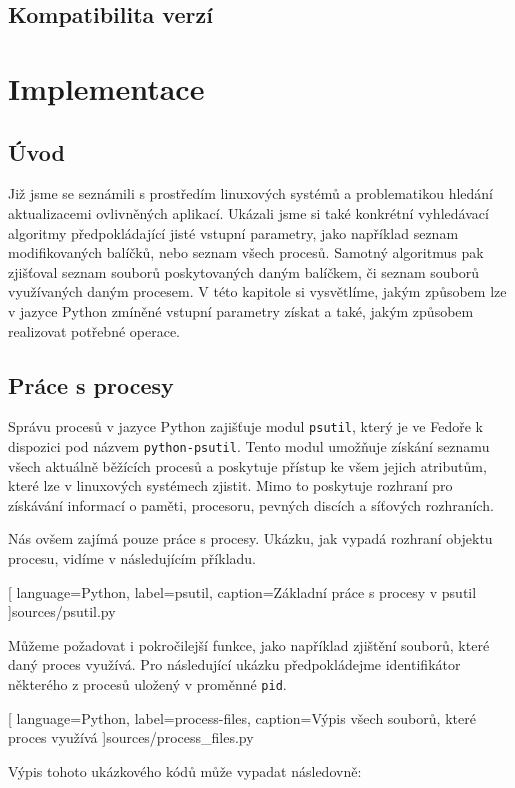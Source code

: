 \documentclass[
  field=inf,
  biblatex,
  glossaries,
  index
]{kidiplom}
\begin{document}
	\subsection{Kompatibilita verzí}

\newpage
\section{Implementace}
	\subsection{Úvod}
	Již jsme se seznámili s prostředím linuxových systémů a problematikou hledání aktualizacemi ovlivněných aplikací. Ukázali jsme si také konkrétní vyhledávací algoritmy předpokládající jisté vstupní parametry, jako například seznam modifikovaných balíčků, nebo seznam všech procesů. Samotný algoritmus pak zjišťoval seznam souborů poskytovaných daným balíčkem, či seznam souborů využívaných daným procesem. V této kapitole si vysvětlíme, jakým způsobem lze v jazyce Python zmíněné vstupní parametry získat a také, jakým způsobem realizovat potřebné operace.

	\subsection{Práce s procesy}
	Správu procesů v jazyce Python zajišťuje modul \texttt{psutil}, který je ve Fedoře k dispozici pod názvem \texttt{python-psutil}. Tento modul umožňuje získání seznamu všech aktuálně běžících procesů a poskytuje přístup ke všem jejich atributům, které lze v linuxových systémech zjistit. Mimo to poskytuje rozhraní pro získávání informací o paměti, procesoru, pevných discích a síťových rozhraních.

	Nás ovšem zajímá pouze práce s procesy. Ukázku, jak vypadá rozhraní objektu procesu, vidíme v následujícím příkladu.

	
	[
		language={Python},
		label=psutil,
		caption={Základní práce s procesy v psutil}
	]{sources/psutil.py}

	Můžeme požadovat i pokročilejší funkce, jako například zjištění souborů, které daný proces využívá. Pro následující ukázku předpokládejme identifikátor některého z procesů uložený v proměnné \texttt{pid}.

	
	[
		language={Python},
		label=process-files,
		caption={Výpis všech souborů, které proces využívá}
	]{sources/process_files.py}

	Výpis tohoto ukázkového kódů může vypadat následovně:
\end{document}
